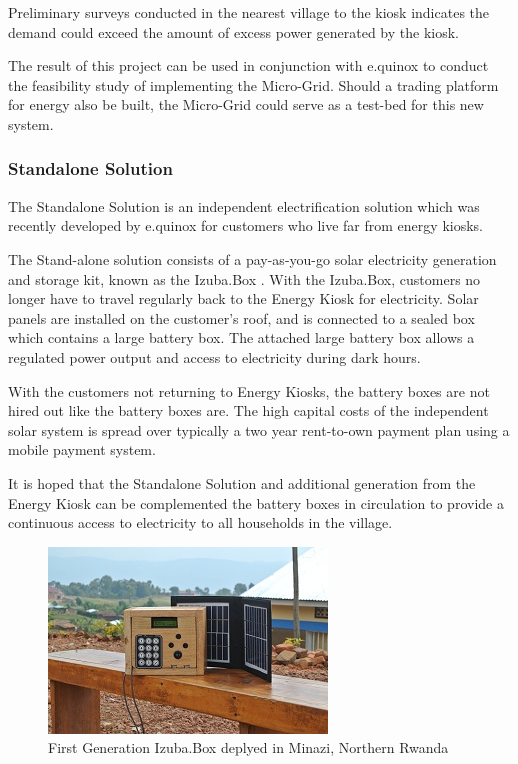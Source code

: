 Preliminary surveys conducted in the nearest village to the kiosk indicates the demand could exceed the amount of excess power generated by the kiosk. 

The result of this project can be used in conjunction with e.quinox to conduct the feasibility study of implementing the Micro-Grid. Should a trading platform for energy also be built, the Micro-Grid could serve as a test-bed for this new system.

\subsubsection*{Standalone Solution}
The Standalone Solution is an independent electrification solution which was recently developed by e.quinox for customers who live far from energy kiosks.

The Stand-alone solution consists of a pay-as-you-go solar electricity generation and storage kit, known as the Izuba.Box \cite{e.quinox-Standalone-web:2012}.  With the Izuba.Box, customers no longer have to travel regularly back to the Energy Kiosk for electricity. Solar panels are installed on the customer’s roof, and is connected to a sealed box which contains a large battery box. The attached large battery box allows a regulated power output and access to electricity during dark hours. 

With the customers not returning to Energy Kiosks, the battery boxes are not hired out like the battery boxes are. The high capital costs of the independent solar system is spread over typically a two year rent-to-own payment plan using a mobile payment system.

It is hoped that the Standalone Solution and additional generation from the Energy Kiosk can be complemented the battery boxes in circulation to provide a continuous access to electricity to all households in the village.

\clearpage

\begin{figure}[h!]
\centering
\includegraphics[scale=3]{Images/standalone_box.jpg}
\caption{First Generation Izuba.Box deplyed in Minazi, Northern Rwanda}
\label{fig:IzubaBox}
\end{figure}

